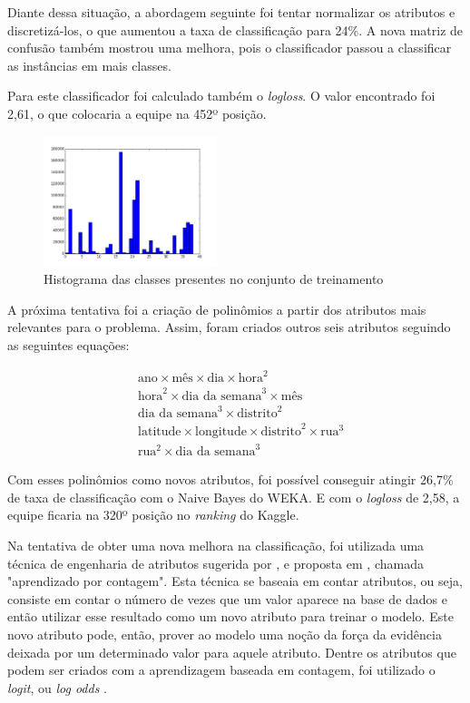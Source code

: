 \documentclass[conference]{IEEEtran}
\begin{document}
Diante dessa situação, a abordagem seguinte foi tentar normalizar os atributos e 
discretizá-los, o que aumentou a taxa de classificação para 24\%. A nova matriz 
de confusão também mostrou uma melhora, pois o classificador passou a 
classificar as instâncias em mais classes.

Para este classificador foi calculado também o \textit{logloss}. O valor 
encontrado foi 2,61, o que colocaria a equipe na 452º posição.

\begin{figure}[t]
	\caption{Histograma das classes presentes no conjunto de treinamento}
	\label{hist}
	\centering
	\includegraphics[width=0.45\textwidth]{hist_categoria}
\end{figure}

A próxima tentativa foi a criação de polinômios a partir dos atributos mais 
relevantes para o problema. Assim, foram criados outros seis atributos seguindo 
as seguintes equações:

\begin{equation}
\begin{aligned}
& \text{ano} \times \text{mês} \times \text{dia} \times \text{hora}^2 \\
& \text{hora}^2 \times \text{dia da semana}^3 \times \text{mês} \\
& \text{dia da semana}^3 \times \text{distrito}^2 \\
& \text{latitude} \times \text{longitude} \times \text{distrito}^2 \times \text{rua}^3 \\
& \text{rua}^2 \times \text{dia da semana}^3
\end{aligned}
\end{equation}

Com esses polinômios como novos atributos, foi possível conseguir atingir 26,7\% 
de taxa de classificação com o Naive Bayes do WEKA. E com o \textit{logloss} de 
2,58, a equipe ficaria na 320º posição no \textit{ranking} do Kaggle.

Na tentativa de obter uma nova melhora na classificação, foi utilizada uma 
técnica de engenharia de atributos sugerida por \cite{papadopc}, e proposta em 
\cite{microsoft}, chamada "aprendizado por contagem". Esta técnica se baseaia em 
contar atributos, ou seja, consiste em contar o número de vezes que um valor 
aparece na base de dados e então utilizar esse resultado como um novo atributo 
para treinar o modelo. Este novo atributo pode, então, prover ao modelo uma 
noção da força da evidência deixada por um determinado valor para aquele 
atributo. Dentre os atributos que podem ser criados com a aprendizagem baseada 
em contagem, foi utilizado o \textit{logit}, ou \textit{log odds} \cite{logit}.
\end{document}
